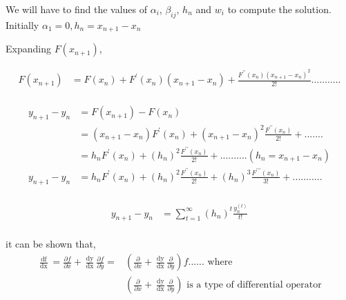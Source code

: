 \documentclass[12 pt]{article}
\begin{document}
	We will have to find the values of $\alpha_{i}$, $\beta_{ij}$, $h_{n}$ and $w_{i}$ to compute the solution. Initially $\alpha_{1} = 0, h_{n}=x_{n+1}-x_{n}$
	
	Expanding $F(x_{n+1})$,
	
	{
		\Large
		\begin{align*}
			F(x_{n+1}) &= F(x_{n}) + F^{\prime}(x_{n})(x_{n+1}-x_{n}) + \frac{F^{\prime\prime}(x_{n})(x_{n+1}-x_{n})^{2}}{2!}...........\\
		\end{align*}
	}
	
	{
		\Large
		\begin{equation}
			\begin{split}
				y_{n+1}-y_{n} &= F(x_{n+1})-F(x_{n}) \\
				&= (x_{n+1}-x_{n})F^{\prime}(x_{n}) + (x_{n+1}-x_{n})^{2} \frac{F^{\prime\prime}(x_{n})}{2!} + ....... \\
				&= h_{n}F^{\prime}(x_{n}) + (h_{n})^{2}\frac{F^{\prime\prime}(x_{n})}{2!} + .......... (h_{n} = x_{n+1} - x_{n})\\
				y_{n+1}-y_{n} &= h_{n}F^{\prime}(x_{n}) + (h_{n})^{2}\frac{F^{\prime\prime}(x_{n})}{2!} + (h_{n})^{3}\frac{F^{\prime\prime\prime}(x_{n})}{3!} + ........... \\
			\end{split}
		\end{equation}
	}
	
	{
		\Large
		\begin{equation}\label{E5}
			\begin{split}
				y_{n+1}-y_{n} &= \sum_{t = 1}^{\infty}(h_{n})^{t}\frac{y_{n}^{(t)}}{t!}\\
			\end{split}
		\end{equation}
	}
	
	it can be shown that, 
	{
		\Large
		\begin{equation*}
			\begin{split}
				\frac{\mathop{\mathrm{df}}}{\mathop{\mathrm{dx}}} = \frac{\partial f}{\partial x} + \frac{\mathop{\mathrm{dy}}}{\mathop{\mathrm{dx}}}\frac{\partial f}{\partial y} =&  (\frac{\partial }{\partial x} + \frac{\mathop{\mathrm{dy}}}{\mathop{\mathrm{dx}}}\frac{\partial }{\partial y})f \text{...... where }\\
				& (\frac{\partial }{\partial x} + \frac{\mathop{\mathrm{dy}}}{\mathop{\mathrm{dx}}}\frac{\partial }{\partial y}) \text{ is a type of differential operator}\\
			\end{split}
		\end{equation*}
	}
	
\end{document}
